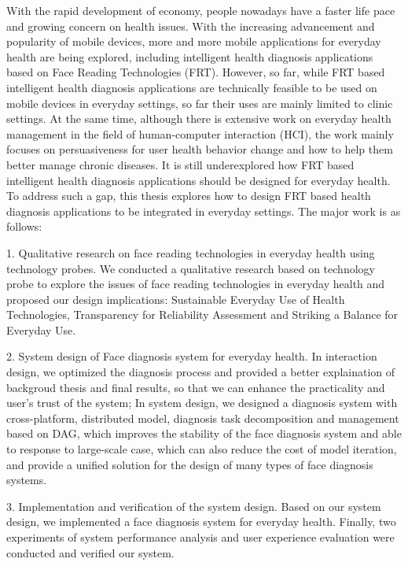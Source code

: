 \documentclass[type=master]{fduthesis}
\begin{document}
\begin{abstract*}

With the rapid development of economy, people nowadays have a faster life pace and growing concern on health issues. With the increasing advancement and popularity of mobile devices, more and more mobile applications for everyday health are being explored, including intelligent health diagnosis applications based on Face Reading Technologies (FRT). However, so far, while FRT based intelligent health diagnosis applications are technically feasible to be used on mobile devices in everyday settings, so far their uses are mainly limited to clinic settings. At the same time, although there is extensive work on everyday health management in the field of human-computer interaction (HCI), the work mainly focuses on persuasiveness for user health behavior change and how to help them better manage chronic diseases. It is still underexplored how FRT based intelligent health diagnosis applications should be designed for everyday health.
To address such a gap, this thesis explores how to design FRT based health diagnosis applications to be integrated in everyday settings. The major work is as follows: 

1.	Qualitative research on face reading technologies in everyday health using technology probes. We conducted a qualitative research based on technology probe to explore the issues of face reading technologies in everyday health and proposed our design implications: Sustainable Everyday Use of Health Technologies, Transparency for Reliability Assessment and Striking a Balance for Everyday Use. 

2.	System design of Face diagnosis system for everyday health. 
In interaction design, we optimized the diagnosis process and provided a better explaination of backgroud thesis and final results, so that we can enhance the practicality and user's trust of the system;
In system design, we designed a diagnosis system with cross-platform, distributed model, diagnosis task decomposition and management based on DAG, which improves the stability of the face diagnosis system and able to response to large-scale case, which can also reduce the cost of model iteration, and provide a unified solution for the design of many types of face diagnosis systems.

3.	Implementation and verification of the system design.
Based on our system design, we implemented a face diagnosis system for everyday health. Finally, two experiments of system performance analysis and user experience evaluation were conducted and verified our system.


\end{abstract*}
\end{document}
